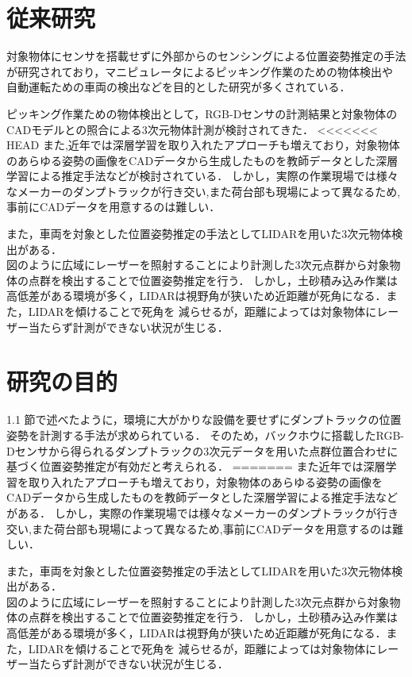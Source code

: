 \newpage

\section{従来研究}
対象物体にセンサを搭載せずに外部からのセンシングによる位置姿勢推定の手法が研究されており，マニピュレータによるピッキング作業のための物体検出や
自動運転ための車両の検出などを目的とした研究が多くされている．

ピッキング作業ための物体検出として，RGB-Dセンサの計測結果と対象物体のCADモデルとの照合による3次元物体計測が検討されてきた．\cite{中原智治2001}\cite{林2008}\cite{西卓郎2014}
<<<<<<< HEAD
また,近年では深層学習を取り入れたアプローチも増えており，対象物体のあらゆる姿勢の画像をCADデータから生成したものを教師データとした深層学習による推定手法\cite{Sundermeyer2018}\cite{Tremblay2018}などが検討されている．
しかし，実際の作業現場では様々なメーカーのダンプトラックが行き交い,また荷台部も現場によって異なるため,事前にCADデータを用意するのは難しい．

また，車両を対象とした位置姿勢推定の手法としてLIDARを用いた3次元物体検出がある．\cite{Zhang2017}\cite{Chen2017}\cite{Lang2019}\\
図のように広域にレーザーを照射することにより計測した3次元点群から対象物体の点群を検出することで位置姿勢推定を行う．
しかし，土砂積み込み作業は高低差がある環境が多く，LIDARは視野角が狭いため近距離が死角になる．また，LIDARを傾けることで死角を
減らせるが，距離によっては対象物体にレーザー当たらず計測ができない状況が生じる．

\newpage

\section{研究の目的}
1.1 節で述べたように，環境に大がかりな設備を要せずにダンプトラックの位置姿勢を計測する手法が求められている．
そのため，バックホウに搭載したRGB-Dセンサから得られるダンプトラックの3次元データを用いた点群位置合わせに基づく位置姿勢推定が有効だと考えられる．
=======
また近年では深層学習を取り入れたアプローチも増えており，対象物体のあらゆる姿勢の画像をCADデータから生成したものを教師データとした深層学習による推定手法\cite{Sundermeyer2018}\cite{Tremblay2018}などがある．
しかし，実際の作業現場では様々なメーカーのダンプトラックが行き交い,また荷台部も現場によって異なるため,事前にCADデータを用意するのは難しい．

また，車両を対象とした位置姿勢推定の手法としてLIDARを用いた3次元物体検出がある．\cite{Zhang2017}\cite{Chen2017}\cite{Lang2019}\\
図のように広域にレーザーを照射することにより計測した3次元点群から対象物体の点群を検出することで位置姿勢推定を行う．
しかし，土砂積み込み作業は高低差がある環境が多く，LIDARは視野角が狭いため近距離が死角になる．また，LIDARを傾けることで死角を
減らせるが，距離によっては対象物体にレーザー当たらず計測ができない状況が生じる．


